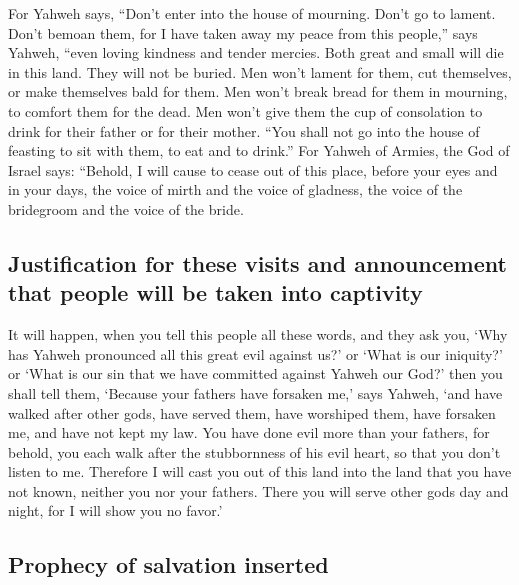  For Yahweh says, ``Don't enter into the house of
mourning. Don't go to lament. Don't bemoan them, for I have taken away
my peace from this people,'' says Yahweh, ``even loving kindness and
tender mercies.  Both great and small will die in this
land. They will not be buried. Men won't lament for them, cut
themselves, or make themselves bald for them.  Men won't
break bread for them in mourning, to comfort them for the dead. Men
won't give them the cup of consolation to drink for their father or for
their mother.  ``You shall not go into the house of
feasting to sit with them, to eat and to drink.''  For
Yahweh of Armies, the God of Israel says: ``Behold, I will cause to
cease out of this place, before your eyes and in your days, the voice of
mirth and the voice of gladness, the voice of the bridegroom and the
voice of the bride.

\hypertarget{justification-for-these-visits-and-announcement-that-people-will-be-taken-into-captivity}{%
\subsection{Justification for these visits and announcement that people
will be taken into
captivity}\label{justification-for-these-visits-and-announcement-that-people-will-be-taken-into-captivity}}

 It will happen, when you tell this people all these
words, and they ask you, `Why has Yahweh pronounced all this great evil
against us?' or `What is our iniquity?' or `What is our sin that we have
committed against Yahweh our God?'  then you shall tell
them, `Because your fathers have forsaken me,' says Yahweh, `and have
walked after other gods, have served them, have worshiped them, have
forsaken me, and have not kept my law.  You have done
evil more than your fathers, for behold, you each walk after the
stubbornness of his evil heart, so that you don't listen to me.
 Therefore I will cast you out of this land into the land
that you have not known, neither you nor your fathers. There you will
serve other gods day and night, for I will show you no favor.'

\hypertarget{prophecy-of-salvation-inserted}{%
\subsection{Prophecy of salvation
inserted}\label{prophecy-of-salvation-inserted}}

